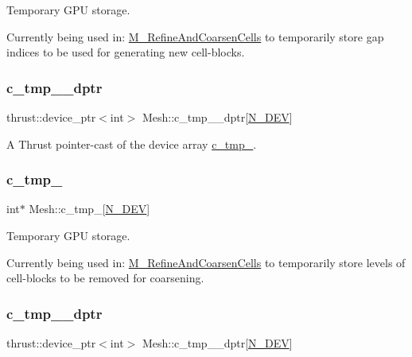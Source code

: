 Temporary G\+PU storage. 

Currently being used in\+: \hyperlink{classMesh_a7f1c861db5b8168cff9dabf728c0ce1a}{M\+\_\+\+Refine\+And\+Coarsen\+Cells} to temporarily store gap indices to be used for generating new cell-\/blocks. \mbox{\label{classMesh_a031a78e18093c0a87d6171f7840d8ce0}} 
\subsubsection{\texorpdfstring{c\+\_\+tmp\+\_\+\_\+dptr}{c\_tmp\_3\_dptr}}
{\footnotesize\ttfamily thrust\+::device\+\_\+ptr$<$int$>$ Mesh\+::c\+\_\+tmp\+\_\+\_\+dptr\mbox{[}\hyperlink{cppspec_8h_a2b674dab7a14f1bf32b48b7fda5022dc}{N\+\_\+\+D\+EV}\mbox{]}\hspace{0.3cm}{\ttfamily [private]}}



A Thrust pointer-\/cast of the device array \hyperlink{classMesh_a7cdb75040bd5f280fd1b019ea99383ac}{c\+\_\+tmp\+\_}. 

\mbox{\label{classMesh_a143a21c2ce68c4b6caa2f7eabd562004}} 
\subsubsection{\texorpdfstring{c\+\_\+tmp\+\_}{c\_tmp\_4}}
{\footnotesize\ttfamily int$\ast$ Mesh\+::c\+\_\+tmp\+\_\mbox{[}\hyperlink{cppspec_8h_a2b674dab7a14f1bf32b48b7fda5022dc}{N\+\_\+\+D\+EV}\mbox{]}\hspace{0.3cm}{\ttfamily [private]}}



Temporary G\+PU storage. 

Currently being used in\+: \hyperlink{classMesh_a7f1c861db5b8168cff9dabf728c0ce1a}{M\+\_\+\+Refine\+And\+Coarsen\+Cells} to temporarily store levels of cell-\/blocks to be removed for coarsening. \mbox{\label{classMesh_a73e052cc381502dc0224d445a3459711}} 
\subsubsection{\texorpdfstring{c\+\_\+tmp\+\_\+\_\+dptr}{c\_tmp\_4\_dptr}}
{\footnotesize\ttfamily thrust\+::device\+\_\+ptr$<$int$>$ Mesh\+::c\+\_\+tmp\+\_\+\_\+dptr\mbox{[}\hyperlink{cppspec_8h_a2b674dab7a14f1bf32b48b7fda5022dc}{N\+\_\+\+D\+EV}\mbox{]}\hspace{0.3cm}{\ttfamily [private]}}



